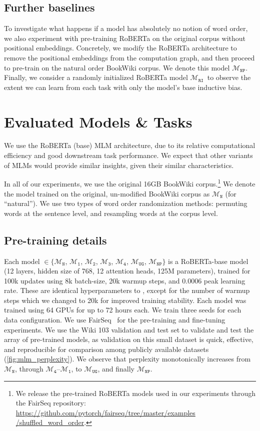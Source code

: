 \documentclass[letterpaper, 12pt]{report}
\newcommand{\OR}{$\mathcal{M}_{\texttt{N}}$}
\newcommand{\RI}{$\mathcal{M}_{\texttt{1}}$}
\newcommand{\RII}{$\mathcal{M}_{\texttt{2}}$}
\newcommand{\RIII}{$\mathcal{M}_{\texttt{3}}$}
\newcommand{\RIV}{$\mathcal{M}_{\texttt{4}}$}
\newcommand{\RC}{$\mathcal{M}_{\texttt{UG}}$}
\newcommand{\RT}{$\mathcal{M}_{\texttt{RI}}$}
\newcommand{\NP}{$\mathcal{M}_{\texttt{NP}}$}
\begin{document}
\subsection{Further baselines}

To investigate what happens if a model has absolutely no notion of word order, we also experiment with pre-training RoBERTa on the original corpus without positional embeddings.
Concretely, we modify the RoBERTa architecture to remove the positional embeddings from the computation graph, and then proceed to pre-train on the natural order BookWiki corpus.
We denote this model \NP.
Finally, we consider a randomly initialized RoBERTa model \RT\, to observe the extent we can learn from each task with only the model's base inductive bias.

\section{Evaluated Models \& Tasks}
\label{sec:mlm_evaluated_models}

We use the RoBERTa (base) \cite{liu2019b} MLM architecture, due to its relative computational efficiency and good downstream task performance. We expect that other variants of MLMs would provide similar insights, given their similar characteristics.

In all of our experiments, we use the original 16GB BookWiki corpus.\footnote{We release the pre-trained RoBERTa models used in our experiments through the FairSeq repository:  \href{https://github.com/pytorch/fairseq/tree/master/examples/shuffled_word_order}{https://github.com/pytorch/fairseq/tree/master/examples /shuffled\_word\_order}.} We denote the model trained on the original, un-modified BookWiki corpus as \OR{} (for ``natural''). We use two types of word order randomization methods: permuting words at the sentence level, and resampling words at the corpus level.


\subsection{Pre-training details}

Each model $\in \{$\OR, \RI, \RII, \RIII, \RIV, \RC, \NP$\}$ is a RoBERTa-base model (12 layers, hidden size of 768, 12 attention heads, 125M parameters), trained for 100k updates using 8k batch-size, 20k warmup steps, and 0.0006 peak learning rate. These are identical hyperparameters to \cite{liu2019b}, except for the number of warmup steps which we changed to 20k for improved training stability. Each model was trained using 64 GPUs for up to 72 hours each. We train three seeds for each data configuration. We use FairSeq~\cite{ott2019fairseq} for the pre-training and fine-tuning experiments.
We use the Wiki 103 validation and test set to validate and test the array of pre-trained models, as validation on this small dataset is quick, effective, and reproducible for comparison among publicly available datasets (\autoref{fig:mlm_perplexity}). We observe that perplexity monotonically increases from \OR, through \RIV--\RI, to \RC, and finally \NP.
\end{document}

